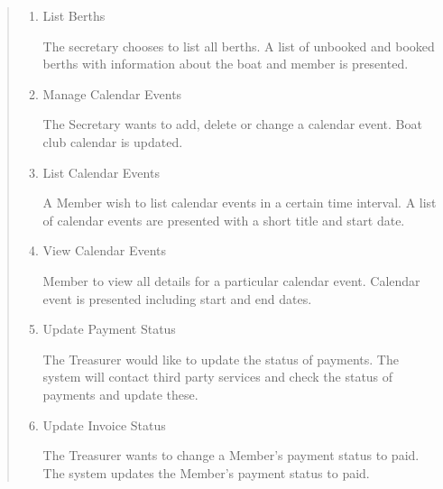 \begin{quote}
\begin{enumerate}
  \item
  List Berths
  
  The secretary chooses to list all berths. A list of unbooked and booked
  berths with information about the boat and member is presented.
  

  \item
  Manage Calendar Events
  
  The Secretary wants to add, delete or change a calendar event. Boat club
  calendar is updated.
  

  \item
  List Calendar Events
  
  A Member wish to list calendar events in a certain time interval. A list
  of calendar events are presented with a short title and start date.
  

  \item
  View Calendar Events
  
  Member to view all details for a particular calendar event. Calendar
  event is presented including start and end dates.
  

  \item
  Update Payment Status
  
  The Treasurer would like to update the status of payments. The system
  will contact third party services and check the status of payments and
  update these.
  

  \item
  Update Invoice Status
  
  The Treasurer wants to change a Member's payment status to paid. The
  system updates the Member's payment status to paid.

\end{enumerate}
\end{quote}

